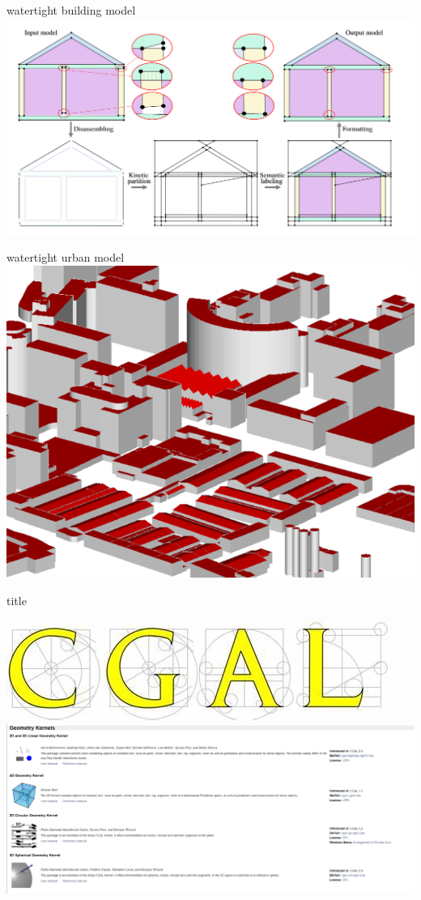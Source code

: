 \documentclass[10pt]{beamer}
\begin{document}
\begin{frame}[plain]{watertight building model}
    \includegraphics[scale = 0.37]{../../images/example_algorithm_2.png}
\end{frame}
\begin{frame}[plain]{watertight urban model}
    \includegraphics[scale = 0.60]{../../images/example_algorithm_3.png}
\end{frame}
\begin{frame}{title}
    
    \includegraphics[scale = 0.2]{../../images/CGAL_logo.png}
    \includegraphics[scale =   0.3 ]{../../images/exemple.png}

\end{frame}
\end{document}

